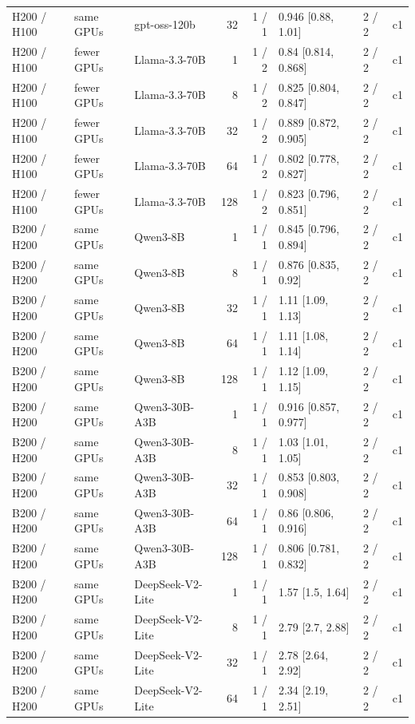 \begin{longtable}{lllrrlll}
H200 / H100 & same GPUs & gpt-oss-120b & 32 & 1 / 1 & 0.946 {[}0.88, 1.01{]} & 2 / 2 & c1 \\
H200 / H100 & fewer GPUs & Llama-3.3-70B & 1 & 1 / 2 & 0.84 {[}0.814, 0.868{]} & 2 / 2 & c1 \\
H200 / H100 & fewer GPUs & Llama-3.3-70B & 8 & 1 / 2 & 0.825 {[}0.804, 0.847{]} & 2 / 2 & c1 \\
H200 / H100 & fewer GPUs & Llama-3.3-70B & 32 & 1 / 2 & 0.889 {[}0.872, 0.905{]} & 2 / 2 & c1 \\
H200 / H100 & fewer GPUs & Llama-3.3-70B & 64 & 1 / 2 & 0.802 {[}0.778, 0.827{]} & 2 / 2 & c1 \\
H200 / H100 & fewer GPUs & Llama-3.3-70B & 128 & 1 / 2 & 0.823 {[}0.796, 0.851{]} & 2 / 2 & c1 \\
B200 / H200 & same GPUs & Qwen3-8B & 1 & 1 / 1 & 0.845 {[}0.796, 0.894{]} & 2 / 2 & c1 \\
B200 / H200 & same GPUs & Qwen3-8B & 8 & 1 / 1 & 0.876 {[}0.835, 0.92{]} & 2 / 2 & c1 \\
B200 / H200 & same GPUs & Qwen3-8B & 32 & 1 / 1 & 1.11 {[}1.09, 1.13{]} & 2 / 2 & c1 \\
B200 / H200 & same GPUs & Qwen3-8B & 64 & 1 / 1 & 1.11 {[}1.08, 1.14{]} & 2 / 2 & c1 \\
B200 / H200 & same GPUs & Qwen3-8B & 128 & 1 / 1 & 1.12 {[}1.09, 1.15{]} & 2 / 2 & c1 \\
B200 / H200 & same GPUs & Qwen3-30B-A3B & 1 & 1 / 1 & 0.916 {[}0.857, 0.977{]} & 2 / 2 & c1 \\
B200 / H200 & same GPUs & Qwen3-30B-A3B & 8 & 1 / 1 & 1.03 {[}1.01, 1.05{]} & 2 / 2 & c1 \\
B200 / H200 & same GPUs & Qwen3-30B-A3B & 32 & 1 / 1 & 0.853 {[}0.803, 0.908{]} & 2 / 2 & c1 \\
B200 / H200 & same GPUs & Qwen3-30B-A3B & 64 & 1 / 1 & 0.86 {[}0.806, 0.916{]} & 2 / 2 & c1 \\
B200 / H200 & same GPUs & Qwen3-30B-A3B & 128 & 1 / 1 & 0.806 {[}0.781, 0.832{]} & 2 / 2 & c1 \\
B200 / H200 & same GPUs & DeepSeek-V2-Lite & 1 & 1 / 1 & 1.57 {[}1.5, 1.64{]} & 2 / 2 & c1 \\
B200 / H200 & same GPUs & DeepSeek-V2-Lite & 8 & 1 / 1 & 2.79 {[}2.7, 2.88{]} & 2 / 2 & c1 \\
B200 / H200 & same GPUs & DeepSeek-V2-Lite & 32 & 1 / 1 & 2.78 {[}2.64, 2.92{]} & 2 / 2 & c1 \\
B200 / H200 & same GPUs & DeepSeek-V2-Lite & 64 & 1 / 1 & 2.34 {[}2.19, 2.51{]} & 2 / 2 & c1 \\

\end{longtable}

